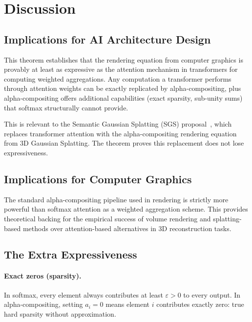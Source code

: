 \documentclass[11pt]{article}
\begin{document}
\section{Discussion}

\subsection{Implications for AI Architecture Design}

This theorem establishes that the rendering equation from computer graphics is provably at least as expressive as the attention mechanism in transformers for computing weighted aggregations. Any computation a transformer performs through attention weights can be exactly replicated by alpha-compositing, plus alpha-compositing offers additional capabilities (exact sparsity, sub-unity sums) that softmax structurally cannot provide.

This is relevant to the Semantic Gaussian Splatting (SGS) proposal~\cite{gorshkov2025}, which replaces transformer attention with the alpha-compositing rendering equation from 3D Gaussian Splatting. The theorem proves this replacement does not lose expressiveness.

\subsection{Implications for Computer Graphics}

The standard alpha-compositing pipeline used in rendering is strictly more powerful than softmax attention as a weighted aggregation scheme. This provides theoretical backing for the empirical success of volume rendering and splatting-based methods over attention-based alternatives in 3D reconstruction tasks.

\subsection{The Extra Expressiveness}

\paragraph{Exact zeros (sparsity).} In softmax, every element always contributes at least $\varepsilon > 0$ to every output. In alpha-compositing, setting $a_i = 0$ means element $i$ contributes exactly zero: true hard sparsity without approximation.
\end{document}
